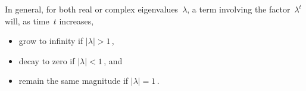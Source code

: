 In general, for both real or complex eigenvalues~\(\lambda\), a term involving the factor~\(\lambda^t\) will, as time~\(t\) increases,
\begin{itemize}
\item grow to infinity if \(|\lambda|>1\)\,,
\item decay to zero if \(|\lambda|<1\)\,, and
\item remain the same magnitude if \(|\lambda|=1\)\,.
\end{itemize}





